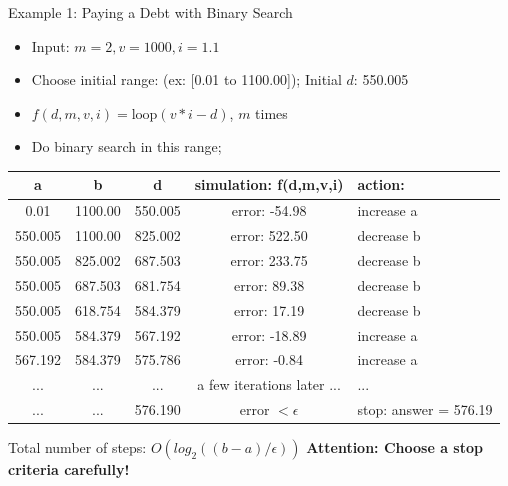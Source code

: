 \begin{frame}{Example 1: Paying a Debt with Binary Search}

\begin{itemize}
  \item Input: $m = 2, v = 1000, i = 1.1$
  \item Choose initial range: (ex: [0.01 to 1100.00]); Initial $d$: 550.005
  \item $f(d,m,v,i) = \text{loop}(v*i - d)$, $m$ times
  \item Do binary search in this range;
\end{itemize}
\bigskip

{\smaller
\begin{tabular}{c|c|c|c|l}
 a & b & d & simulation: f(d,m,v,i) & action: \\
 \hline
 0.01 & 1100.00 & 550.005 & error: -54.98 & increase a\\
 550.005 & 1100.00 & 825.002 & error: 522.50 & decrease b\\
 550.005 & 825.002 & 687.503 & error: 233.75 & decrease b\\
 550.005 & 687.503 & 681.754 & error: 89.38 & decrease b\\
 550.005 & 618.754 & 584.379 & error: 17.19 & decrease b\\
 550.005 & 584.379 & 567.192 & error: -18.89 & increase a\\
 567.192 & 584.379 & 575.786 & error: -0.84 & increase a\\
 ... & ... & ... & a few iterations later ... & ...\\
 ... & ... & 576.190 & error $< \epsilon$ & stop: answer = 576.19\\
\end{tabular}}
\bigskip

Total number of steps: $O(log_2((b-a)/\epsilon))$ \hfill{\bf Attention: Choose a stop criteria carefully!}
\end{frame}

